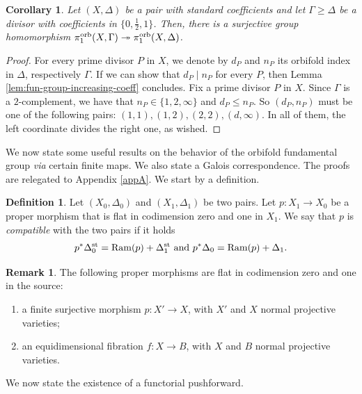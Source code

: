 \documentclass{amsart}
\newtheorem{corollary}[theorem]{Corollary}
\theoremstyle{definition}
\newtheorem{definition}[theorem]{Definition}
\newtheorem{remark}[theorem]{Remark}
\theoremstyle{remark}
\numberwithin{equation}{section}
\begin{document}
\begin{corollary}\label{cor:2cplt-sur}
Let $(X,\Delta)$ be a pair with standard coefficients and let $\Gamma \ge \Delta$ be a divisor with coefficients in $\{0,\frac{1}{2},1\}$.
Then, there is a surjective group homomorphism $\pi_1^{\rm orb}(X,\Gamma)\twoheadrightarrow \pi_1^{\rm orb}(X,\Delta)$.
\end{corollary}

\begin{proof}
For every prime divisor $P$ in $X$, we denote by $d_P$ and $n_P$ its orbifold index in $\Delta$, respectively $\Gamma$. If we can show that $d_P\mid n_P$ for every $P$, then Lemma \ref{lem:fun-group-increasing-coeff} concludes.
Fix a prime divisor $P$ in $X$. Since $\Gamma$ is a $2$-complement, we have that $n_P\in\{1,2,\infty\}$ and $d_P\le n_P$. So $(d_P,n_P)$ must be one of the following pairs:
    $(1,1),(1,2),(2,2),(d,\infty).$
In all of them, the left coordinate divides the right one, as wished.
\end{proof}

We now state some useful results on the behavior of the orbifold fundamental group {\it via} certain finite maps. We also state a Galois correspondence. The proofs are relegated to Appendix \ref{appA}.
We start by a definition.

\begin{definition}\label{def:compatible} 
Let $(X_0,\Delta_0)$ and $(X_1,\Delta_1)$ be two pairs. Let $p:X_1\to X_0$ be a proper morphism that is flat in codimension zero and one in $X_1$.
We say that $p$ is \emph{compatible} with the two pairs if it holds
    $$p^*\Delta_0^{\rm st}={\rm Ram}(p)+{\Delta}_1^{\rm st} \mbox{ and }p^*\Delta_0={\rm Ram}(p)+\Delta_1.$$
\end{definition}

\begin{remark}
    The following proper morphisms are flat in codimension zero and one in the source:
    \begin{enumerate}
        \item a finite surjective morphism $p:X'\to X$, with $X'$ and $X$ normal projective varieties;
        \item an equidimensional fibration $f:X\to B$,  with $X$ and $B$ normal projective varieties.
    \end{enumerate}
\end{remark}

We now state the existence of a functorial pushforward.
\end{document}
